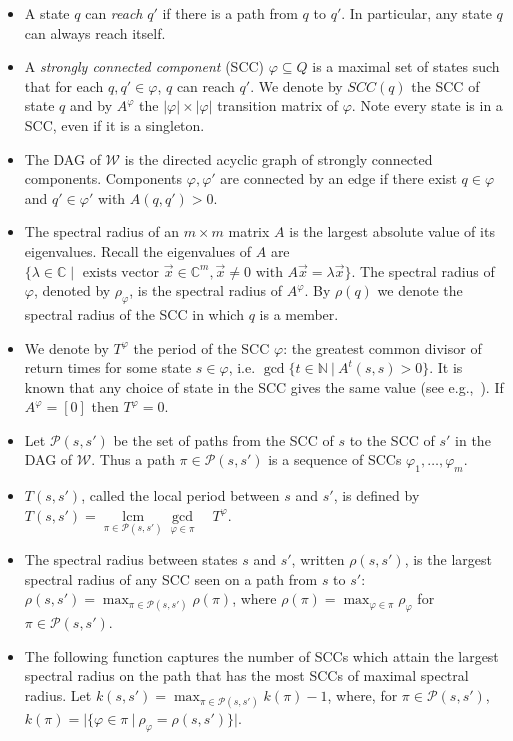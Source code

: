 \documentclass[10pt,a4paper]{amsart}
\numberwithin{equation}{section}
\theoremstyle{plain}
\theoremstyle{definition}
\theoremstyle{remark}
\newcommand\period{T}
\newcommand{\scc}{\varphi}
\newcommand\wa{\mathcal{W}}
\begin{document}
\begin{defi}\hfill
\begin{itemize}
\item  A state $q$ can \textit{reach} $q'$ if there is a path from $q$ to $q'$. In particular, any state $q$ can always reach itself.
\item A \textit{strongly connected component} (SCC) $\scc \subseteq Q$ is a maximal set of states such that for each $q,q' \in \scc$, $q$ can reach $q'$. We denote by $SCC(q)$ the SCC of state $q$ and  by $A^\scc$ the $|\scc| \times |\scc|$ transition matrix of $\scc$. Note every state is in a SCC, even if it is a singleton.

\item
The DAG of $\wa$ is the directed acyclic graph of strongly connected components. Components $\scc, \scc'$ are connected by an edge if there exist $q\in\scc$ and $q'\in\scc'$ with $A(q,q') > 0$.

\item
The spectral radius of an $m\times m$ matrix $A$ is the largest absolute value of its eigenvalues. Recall the eigenvalues of $A$ are  $\{\lambda \in \mathbb{C} \mid \text{ exists vector } \vec{x} \in \mathbb{C}^m, \vec{x}\ne 0 \text{ with } A\vec{x} = \lambda \vec{x} \}$. The spectral radius of $\scc$, denoted by $\rho_\scc$, is the spectral radius of $A^\scc$. By $\rho(q)$ we denote the spectral radius of the SCC in which $q$ is a member. 

\item We denote by $\period^\scc$ the period of the SCC $\scc$: the greatest common divisor of return times for some state $s\in \scc$, i.e. $\operatorname*{gcd}\{t\in \mathbb{N} \ | \ A^t(s,s) > 0\}$. It is known that any choice of state in the SCC gives the same value (see e.g.,~\cite[Theorem 1.20]{sericola2013markov}). If  $A^\scc = [0]$ then $\period^\scc = 0$.
\item Let $\mathscr{P}(s,s')$ be the set of paths from the SCC of $s$ to the SCC of $s'$ in the DAG of $\wa$. Thus a path $\pi \in \mathscr{P}(s,s')$ is a sequence of SCCs $\scc_1, \dots, \scc_m$.
\item $\period(s,s')$, called the local period between $s$ and $s'$, is defined by $\period(s,s') = \operatorname*{lcm}\limits_{\pi \in \mathscr{P}(s,s')}\operatorname*{gcd}\limits_{\scc \in \pi}\quad \period^\scc$.
\item The spectral radius between states $s$ and $s'$, written $\rho(s,s')$, is the largest spectral radius of any SCC seen on a path from $s$ to $s'$:
$\rho(s,s') = \max_{\pi \in \mathscr{P}(s,s')} \rho(\pi)$,
where $\rho(\pi) = \max_{\scc \in \pi} \rho_\scc$ for  $\pi \in \mathscr{P}(s,s')$.
\item
 The following function captures the number of SCCs which attain the largest spectral radius on the path that has the most SCCs of maximal spectral radius. Let $k(s,s')  = \max_{\pi \in \mathscr{P}(s,s')} k(\pi) - 1$,
where, for $\pi \in \mathscr{P}(s,s')$, $k(\pi) = |\{\scc \in \pi \ |\  \rho_\scc = \rho(s,s') \}|$.

\end{itemize}
\end{defi}
\end{document}
